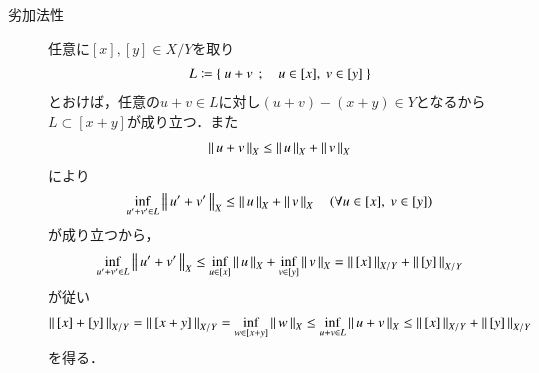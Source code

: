 \begin{prf}
\begin{description}
			\item[劣加法性]
				任意に$[x],[y] \in X/Y$を取り
				\begin{align}
					L \coloneqq \left\{\ u + v\ \, ; \quad u \in [x],\ v \in [y]\ \right\}
				\end{align}
				とおけば，任意の$u+v \in L$に対し$(u+v) - (x+y) \in Y$となるから$L \subset [x+y]$が成り立つ．また
				\begin{align}
					\left\|\, u + v\, \right\|_{X} \leq \left\|\, u\, \right\|_{X} + \left\|\, v\, \right\|_{X}
				\end{align}
				により
				\begin{align}
					\operatorname*{inf}_{u'+v' \in L} \left\|\, u' + v'\, \right\|_{X} \leq \left\|\, u\, \right\|_{X} + \left\|\, v\, \right\|_{X} \quad (\forall u \in [x],\ v \in [y])
				\end{align}
				が成り立つから，
				\begin{align}
					\operatorname*{inf}_{u'+v' \in L} \left\|\, u' + v'\, \right\|_{X} 
					\leq \operatorname*{inf}_{u \in [x]} \left\|\, u\, \right\|_{X} + \operatorname*{inf}_{v \in [y]} \left\|\, v\, \right\|_{X}
					= \left\|\, [x]\, \right\|_{X/Y} + \left\|\, [y]\, \right\|_{X/Y}
				\end{align}
				が従い
				\begin{align}
					\left\|\, [x] + [y]\, \right\|_{X/Y} = \left\|\, [x+y]\, \right\|_{X/Y} 
					= \operatorname*{inf}_{w \in [x+y]} \left\|\, w\, \right\|_{X} 
					\leq \operatorname*{inf}_{u+v \in L} \left\|\, u + v\, \right\|_{X}
					\leq \left\|\, [x]\, \right\|_{X/Y} + \left\|\, [y]\, \right\|_{X/Y}
				\end{align}
				を得る．
				\QED
		\end{description}
	\end{prf}